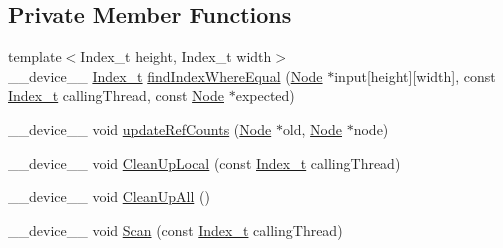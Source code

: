 \subsection*{Private Member Functions}
\begin{DoxyCompactItemize}
\item 
{\footnotesize template$<$Index\+\_\+t height, Index\+\_\+t width$>$ }\\\+\_\+\+\_\+device\+\_\+\+\_\+ \mbox{\hyperlink{class_n_u_c_a_r_lock_free_d_s_1_1_allocator_a2776cca35e8343bf5007bd8b6f3a3f8f}{Index\+\_\+t}} \mbox{\hyperlink{class_n_u_c_a_r_lock_free_d_s_1_1_allocator_a3bf029c737539d9bfa9c9296ac17d83b}{find\+Index\+Where\+Equal}} (\mbox{\hyperlink{class_n_u_c_a_r_lock_free_d_s_1_1_allocator_1_1_node}{Node}} $\ast$input\mbox{[}height\mbox{]}\mbox{[}width\mbox{]}, const \mbox{\hyperlink{class_n_u_c_a_r_lock_free_d_s_1_1_allocator_a2776cca35e8343bf5007bd8b6f3a3f8f}{Index\+\_\+t}} calling\+Thread, const \mbox{\hyperlink{class_n_u_c_a_r_lock_free_d_s_1_1_allocator_1_1_node}{Node}} $\ast$expected)
\item 
\+\_\+\+\_\+device\+\_\+\+\_\+ void \mbox{\hyperlink{class_n_u_c_a_r_lock_free_d_s_1_1_allocator_a8bd90fb5b60a5e8099775c1725a0613d}{update\+Ref\+Counts}} (\mbox{\hyperlink{class_n_u_c_a_r_lock_free_d_s_1_1_allocator_1_1_node}{Node}} $\ast$old, \mbox{\hyperlink{class_n_u_c_a_r_lock_free_d_s_1_1_allocator_1_1_node}{Node}} $\ast$node)
\item 
\+\_\+\+\_\+device\+\_\+\+\_\+ void \mbox{\hyperlink{class_n_u_c_a_r_lock_free_d_s_1_1_allocator_afdfba24913e993f6572d4a5b0f6c701c}{Clean\+Up\+Local}} (const \mbox{\hyperlink{class_n_u_c_a_r_lock_free_d_s_1_1_allocator_a2776cca35e8343bf5007bd8b6f3a3f8f}{Index\+\_\+t}} calling\+Thread)
\item 
\+\_\+\+\_\+device\+\_\+\+\_\+ void \mbox{\hyperlink{class_n_u_c_a_r_lock_free_d_s_1_1_allocator_a0498950ecff0d5354daab89e8f12d6d5}{Clean\+Up\+All}} ()
\item 
\+\_\+\+\_\+device\+\_\+\+\_\+ void \mbox{\hyperlink{class_n_u_c_a_r_lock_free_d_s_1_1_allocator_ab5813e074d787aa0fc50f1b02061a973}{Scan}} (const \mbox{\hyperlink{class_n_u_c_a_r_lock_free_d_s_1_1_allocator_a2776cca35e8343bf5007bd8b6f3a3f8f}{Index\+\_\+t}} calling\+Thread)
\end{DoxyCompactItemize}
